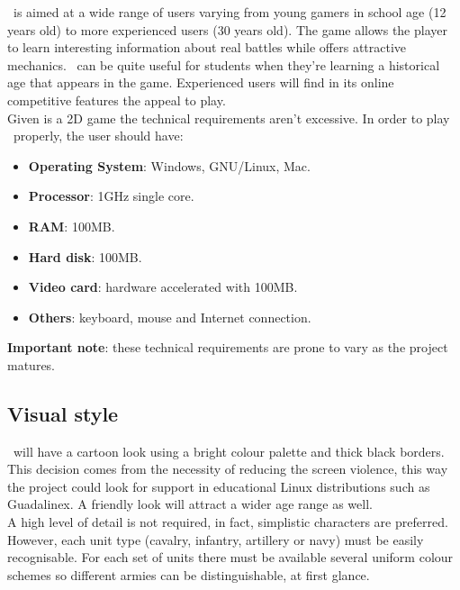 \game\ is aimed at a wide range of users varying from young gamers
in school age (12 years old) to more experienced users (30 years old).
The game allows the player to learn interesting information about real
battles while offers attractive mechanics. \game\ can be quite useful for
students when they're learning a historical age that appears in the game.
Experienced users will find in its online competitive features the appeal
to play.\\

Given is a 2D game the technical requirements aren't excessive. In order
to play \game\ properly, the user should have:

\begin{itemize}
    \item \textbf{Operating System}: Windows, GNU/Linux, Mac.
    \item \textbf{Processor}: 1GHz single core.
    \item \textbf{RAM}: 100MB.
    \item \textbf{Hard disk}: 100MB.
    \item \textbf{Video card}: hardware accelerated with 100MB.
    \item \textbf{Others}: keyboard, mouse and Internet connection.
\end{itemize}

\textbf{Important note}: these technical requirements are prone to vary as the
project matures.

\subsection{Visual style}

\game\ will have a cartoon look using a bright colour palette and thick
black borders. This decision comes from the necessity of reducing the screen
violence, this way the project could look for support in educational Linux distributions
such as Guadalinex. A friendly look will attract a wider age range as well.\\

A high level of detail is not required, in fact, simplistic characters are
preferred. However, each unit type (cavalry, infantry, artillery or navy) must be easily
recognisable. For each set of units there must be available several uniform
colour schemes so different armies can be distinguishable, at first glance.

